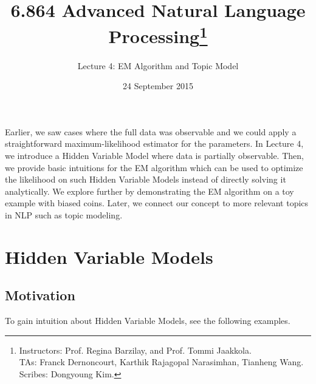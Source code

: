 \documentclass[justified, marginals=justified]{tufte-handout}
\title{6.864 Advanced Natural Language Processing\thanks{Instructors: Prof. Regina Barzilay, and Prof. Tommi Jaakkola.\\ TAs: Franck Dernoncourt, Karthik Rajagopal Narasimhan, Tianheng Wang. \\ Scribes: Dongyoung Kim.}}
\author[Lecture 4: EM Algorithm and Topic Model]{Lecture 4: EM Algorithm and Topic Model}
\date{24 September 2015} %
\theoremstyle{definition}
\begin{document}
\maketitle%

Earlier, we saw cases where the full data was observable and we could apply a straightforward maximum-likelihood estimator for the parameters. In Lecture 4, we introduce a Hidden Variable Model where data is partially observable. Then, we provide basic intuitions for the EM algorithm which can be used to optimize the likelihood on such Hidden Variable Models instead of directly solving it analytically. We explore further by demonstrating the EM algorithm on a toy example with biased coins. Later, we connect our concept to more relevant topics in NLP such as topic modeling.  

\section{Hidden Variable Models}\label{sec:hidden-variable-models}

\subsection{Motivation}\label{sec:motivation}

To gain intuition about Hidden Variable Models, see the following examples. 
\end{document}
